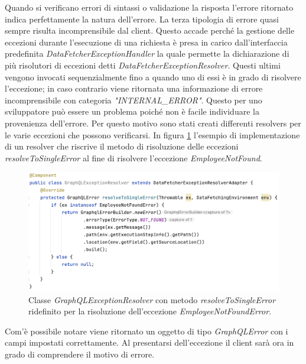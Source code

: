 Quando si verificano errori di sintassi o validazione la risposta l'errore ritornato indica perfettamente la natura dell'errore. La terza tipologia di errore quasi sempre risulta incomprensibile dal client. Questo accade perché la gestione delle eccezioni durante l'esecuzione di una richiesta è presa in carico dall'interfaccia predefinita \textit{DataFetcherExceptionHandler} la quale permette la dichiarazione di più risolutori di eccezioni detti \textit{DataFetcherExceptionResolver}. Questi ultimi vengono invocati sequenzialmente fino a quando uno di essi è in grado di risolvere l'eccezione; in caso contrario viene ritornata una informazione di errore incomprensibile con categoria \textit{"INTERNAL\_ERROR"}. Questo per uno sviluppatore può essere un problema poiché non è facile individuare la provenienza dell'errore. Per questo motivo sono stati creati differenti resolvers per le varie eccezioni che possono verificarsi. In figura \ref{resolver-example} l'esempio di implementazione di un resolver che riscrive il metodo di risoluzione delle eccezioni \textit{resolveToSingleError} al fine di risolvere l'eccezione \textit{EmployeeNotFound}.
\FloatBarrier
\begin{figure}[!ht]
\centering
\includegraphics[width=0.8\linewidth]{immagini/resolverExample.png}
\caption{Classe \textit{GraphQLExceptionResolver} con metodo \textit{resolveToSingleError} ridefinito per la risoluzione dell'eccezione \textit{EmployeeNotFoundError}.}
\label{resolver-example}
\end{figure}
\FloatBarrier
Com'è possibile notare viene ritornato un oggetto di tipo \textit{GraphQLError} con i campi impostati correttamente. Al presentarsi dell'eccezione il client sarà ora in grado di comprendere il motivo di errore.
